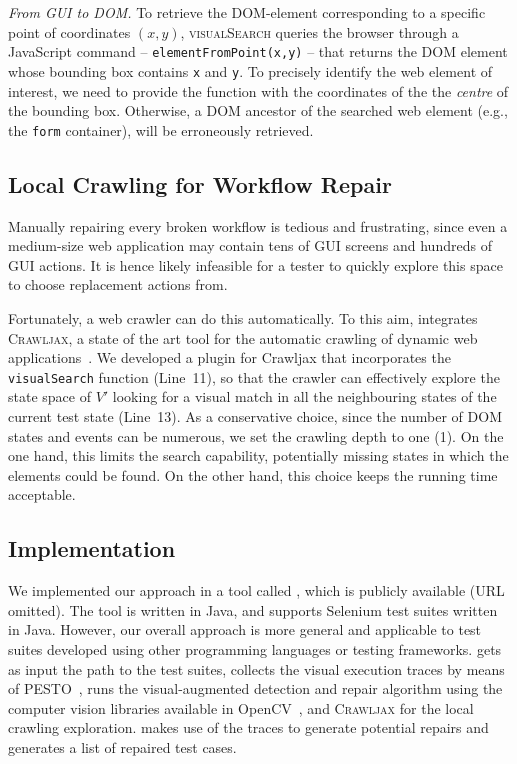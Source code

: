 \textit{From GUI to DOM.}
To retrieve the DOM-element corresponding to a specific point of coordinates $(x,y)$, \textsc{visualSearch} queries the browser through a JavaScript command -- \texttt{elementFromPoint(x,y)} -- that returns the DOM element whose bounding box contains \texttt{x} and \texttt{y}. To precisely identify the web element of interest, we need to provide the function with the coordinates of the the \textit{centre} of the bounding box. Otherwise, a DOM ancestor of the searched web element (e.g., the \texttt{form} container), will be erroneously retrieved.

\subsection{Local Crawling for Workflow Repair}

Manually repairing every broken workflow is tedious and frustrating, since even a medium-size web application may contain tens of GUI screens and hundreds of GUI actions. It is hence likely infeasible for a tester to quickly explore this space to choose replacement actions from.

Fortunately, a web crawler can do this automatically. To this aim, \tool integrates \textsc{Crawljax}, a state of the art tool for the automatic crawling of dynamic web applications~\cite{mesbah:tweb12,mesbah:tse12}. We developed a plugin for Crawljax that incorporates the \texttt{visualSearch} function (Line~11), so that the crawler can effectively explore the state space of $V'$ looking for a visual match in all the neighbouring states of the current test state (Line~13). As a conservative choice, since the number of DOM states and events can be numerous, we set the crawling depth to one (1). On the one hand, this limits the search capability, potentially missing states in which the elements could be found. On the other hand, this choice keeps the running time acceptable.

\subsection{Implementation}\label{sec:implementation}

We implemented our approach in a tool called \tool, which is publicly available (URL omitted). 
The tool is written in Java, and supports Selenium test suites written in Java. However, our overall approach is more general and applicable to test suites developed using other programming languages or testing frameworks. 
\tool gets as input the path to the test suites, collects the visual execution traces by means of \textsc{PESTO}~\cite{2014-Stocco-SCAM}, runs the visual-augmented detection and repair algorithm using the computer vision libraries available in OpenCV~\cite{}, and \textsc{Crawljax} for the local crawling exploration. 
\tool makes use of the traces to generate potential repairs and generates a list of repaired test cases.







